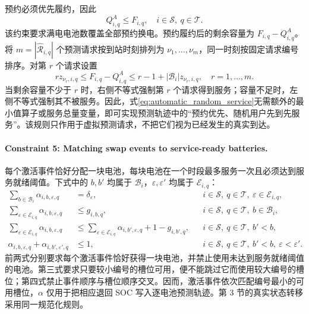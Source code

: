 \documentclass[12pt,a4paper,UTF8]{ctexart}
\begin{document}
预约必须优先履约，因此
\begin{equation}
Q_{i,q}^{A}\le F_{i,q},
\quad i\in\mathcal S,\ q\in\mathcal T.
\label{eq:reservation_priority}
\end{equation}
该约束要求满电电池数覆盖全部预约换电。预约履约后的剩余容量为 $F_{i,q}-Q_{i,q}^{A}$。将 $m=|\widehat{\mathcal R}_{i,q}|$ 个预测请求按到站时刻排列为 $\nu_1,\ldots,\nu_m$，同一时刻按固定请求编号排序。对第 $r$ 个请求设置
\begin{equation}
rz_{\nu_r,i,q}
\le F_{i,q}-Q_{i,q}^{A}
\le r-1+|\mathcal B_i|z_{\nu_r,i,q},
\quad r=1,\ldots,m.
\label{eq:automatic_random_service}
\end{equation}
当剩余容量不少于 $r$ 时，右侧不等式强制第 $r$ 个请求得到服务；容量不足时，左侧不等式强制其不被服务。因此，式\eqref{eq:automatic_random_service}无需额外的最小值算子或服务总量变量，即可实现预测轨迹中的“预约优先、随机用户先到先服务”。该规则只作用于虚拟预测请求，不把它们视为已经发生的真实到达。

\paragraph{Constraint 5: Matching swap events to service-ready batteries.}
每个激活事件恰好分配一块电池，每块电池在一个时段最多服务一次且必须达到服务就绪阈值。下式中的 $b,b'$ 均属于 $\mathcal B_i$，$\varepsilon,\varepsilon'$ 均属于 $\mathcal E_{i,q}$：
\begin{subequations}
\label{eq:battery_event_assignment}
\begin{align}
\sum_{b\in\mathcal B_i}\alpha_{i,b,\varepsilon,q}
&=\delta_\varepsilon,
&&i\in\mathcal S,\ q\in\mathcal T,\ \varepsilon\in\mathcal E_{i,q},\\
\sum_{\varepsilon\in\mathcal E_{i,q}}\alpha_{i,b,\varepsilon,q}
&\le g_{i,b,q},
&&i\in\mathcal S,\ q\in\mathcal T,\ b\in\mathcal B_i,\\
\sum_{\varepsilon\in\mathcal E_{i,q}}\alpha_{i,b,\varepsilon,q}
&\le
\sum_{\varepsilon\in\mathcal E_{i,q}}\alpha_{i,b',\varepsilon,q}
+1-g_{i,b',q},
&&i\in\mathcal S,\ q\in\mathcal T,\ b'<b,\\
\alpha_{i,b,\varepsilon,q}+\alpha_{i,b',\varepsilon',q}
&\le1,
&&i\in\mathcal S,\ q\in\mathcal T,\ b'<b,\
\varepsilon<\varepsilon'.
\end{align}
\end{subequations}
前两式分别要求每个激活事件恰好获得一块电池，并禁止使用未达到服务就绪阈值的电池。第三式要求只要较小编号的槽位可用，便不能跳过它而使用较大编号的槽位；第四式禁止事件顺序与槽位顺序交叉。因而，激活事件依次匹配编号最小的可用槽位，$\alpha$ 仅用于把相应退回 SOC 写入逐电池预测轨迹。第 3 节的真实状态转移采用同一规范化规则。
\end{document}
